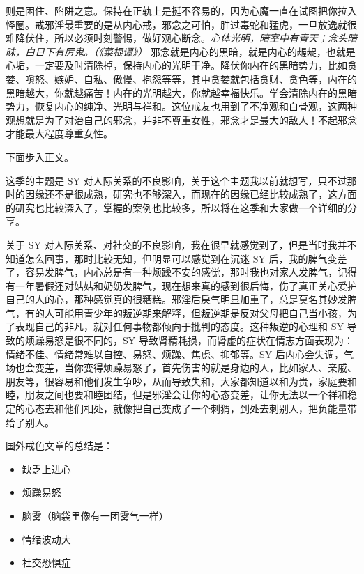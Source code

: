 \begin{case}
则是困住、陷阱之意。保持在正轨上是挺不容易的，因为心魔一直在试图把你拉入怪圈。戒邪淫最重要的是从内心戒，邪念之可怕，胜过毒蛇和猛虎，一旦放逸就很难降伏住，所以必须时刻警惕，做好观心断念。\textit{心体光明，暗室中有青天；念头暗昧，白日下有厉鬼。（《菜根谭》）} 邪念就是内心的黑暗，就是内心的龌龊，也就是心垢，一定要及时清除掉，保持内心的光明干净。降伏你内在的黑暗势力，比如贪婪、嗔怒、嫉妒、自私、傲慢、抱怨等等，其中贪婪就包括贪财、贪色等，内在的黑暗越大，你就越痛苦！内在的光明越大，你就越幸福快乐。学会清除内在的黑暗势力，恢复内心的纯净、光明与祥和。这位戒友也用到了不净观和白骨观，这两种观想就是为了对治自己的邪念，并非不尊重女性，邪念才是最大的敌人！不起邪念才能最大程度尊重女性。
\end{case}

下面步入正文。

这季的主题是 SY 对人际关系的不良影响，关于这个主题我以前就想写，只不过那时的因缘还不是很成熟，研究也不够深入，而现在的因缘已经比较成熟了，这方面的研究也比较深入了，掌握的案例也比较多，所以将在这季和大家做一个详细的分享。

关于 SY 对人际关系、对社交的不良影响，我在很早就感觉到了，但是当时我并不知道怎么回事，那时比较无知，但明显可以感觉到在沉迷 SY 后，我的脾气变差了，容易发脾气，内心总是有一种烦躁不安的感觉，那时我也对家人发脾气，记得有一年暑假还对姑姑和奶奶发脾气，现在想来真的感到很后悔，伤了真正关心爱护自己的人的心，那种感觉真的很糟糕。邪淫后戾气明显加重了，总是莫名其妙发脾气，有的人可能用青少年的叛逆期来解释，但叛逆期是反对父母把自己当小孩，为了表现自己的非凡，就对任何事物都倾向于批判的态度。这种叛逆的心理和 SY 导致的烦躁易怒是很不同的，SY 导致肾精耗损，而肾虚的症状在情志方面表现为：情绪不佳、情绪常难以自控、易怒、烦躁、焦虑、抑郁等。SY 后内心会失调，气场也会变差，当你变得烦躁易怒了，首先伤害的就是身边的人，比如家人、亲戚、朋友等，很容易和他们发生争吵，从而导致失和，大家都知道以和为贵，家庭要和睦，朋友之间也要和睦团结，但是邪淫会让你的心态变差，让你无法以一个祥和稳定的心态去和他们相处，就像把自己变成了一个刺猬，到处去刺别人，把负能量带给了别人。

国外戒色文章的总结是：

\begin{multicols}{2}
    \begin{itemize}
        \item 缺乏上进心
        \item 烦躁易怒
        \item 脑雾（脑袋里像有一团雾气一样）
        \item 情绪波动大
        \item 社交恐惧症
    \end{itemize}
\end{multicols}

